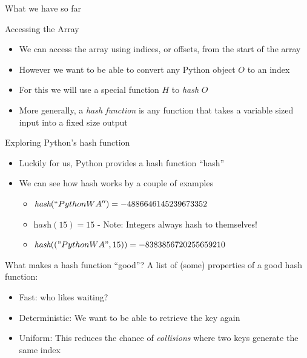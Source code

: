 \documentclass[12pt, aspectration=1610]{beamer}
\begin{document}
    \begin{frame}{What we have so far}
    \end{frame}
    \begin{frame}{Accessing the Array}
        \begin{itemize}
            \item We can access the array using indices, or offsets, from the start of the array
            \item However we want to be able to convert any Python object $O$ to an index
            \item For this we will use a special function $H$ to \textit{hash} $O$
            \item More generally, a \textit{hash function} is any function that takes a variable sized input into a fixed size output
        \end{itemize}
    \end{frame}
    \begin{frame}{Exploring Python's hash function}
        \begin{itemize}
            \item Luckily for us, Python provides a hash function ``hash''
            \item We can see how hash works by a couple of examples
                \begin{itemize}
                    \item $\textit{hash}(``PythonWA'') = -4886646145239673352$ 
                    \item $\textit{hash}(15) = 15$ - Note: Integers always hash to themselves!
                    \item $\textit{hash}(("PythonWA", 15)) = -8383856720255659210$ 
                \end{itemize}
        \end{itemize}
    \end{frame}

    \begin{frame}{What makes a hash function ``good''? }
        A list of (some) properties of a good hash function:
        \begin{itemize}
            \item Fast: who likes waiting? 
            \item Deterministic: We want to be able to retrieve the key again 
            \item Uniform: This reduces the chance of \textit{collisions} where two keys generate the same index
        \end{itemize}
    \end{frame}
 
\end{document}
